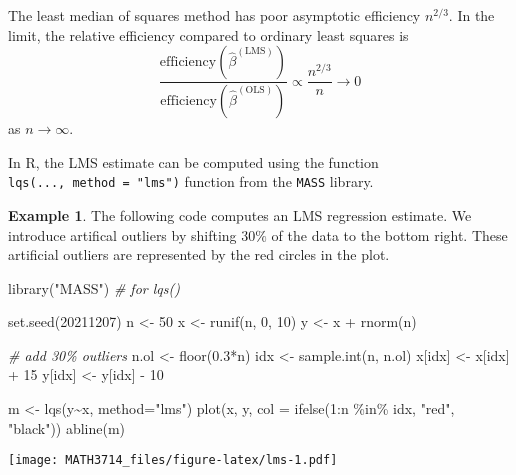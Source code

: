 \documentclass[
  a4paper,
]{article}
\newenvironment{Shaded}{\begin{snugshade}}{\end{snugshade}}
\newcommand{\AttributeTok}[1]{\textcolor[rgb]{0.77,0.63,0.00}{#1}}
\newcommand{\CommentTok}[1]{\textcolor[rgb]{0.56,0.35,0.01}{\textit{#1}}}
\newcommand{\DecValTok}[1]{\textcolor[rgb]{0.00,0.00,0.81}{#1}}
\newcommand{\FloatTok}[1]{\textcolor[rgb]{0.00,0.00,0.81}{#1}}
\newcommand{\FunctionTok}[1]{\textcolor[rgb]{0.00,0.00,0.00}{#1}}
\newcommand{\NormalTok}[1]{#1}
\newcommand{\OtherTok}[1]{\textcolor[rgb]{0.56,0.35,0.01}{#1}}
\newcommand{\SpecialCharTok}[1]{\textcolor[rgb]{0.00,0.00,0.00}{#1}}
\newcommand{\StringTok}[1]{\textcolor[rgb]{0.31,0.60,0.02}{#1}}
\theoremstyle{definition}
\theoremstyle{definition}
\newtheorem{example}{Example}[section]
\theoremstyle{definition}
\theoremstyle{definition}
\theoremstyle{remark}
\begin{document}
The least median of squares method has poor asymptotic efficiency \(n^{2/3}\).
In the limit, the relative efficiency compared to ordinary least squares is
\begin{equation*}
  \frac{\mathrm{efficiency}(\hat\beta^\mathrm{(LMS)})}{\mathrm{efficiency}(\hat\beta^\mathrm{(OLS)})}
  \propto \frac{n^{2/3}}{n}
  \longrightarrow 0
\end{equation*}
as \(n\to\infty\).

In R, the LMS estimate can be computed using the function
\texttt{lqs(...,\ method\ =\ "lms")} function from the \texttt{MASS} library.

\begin{example}
The following code computes an LMS regression estimate. We
introduce artifical outliers by shifting \(30\%\) of the data
to the bottom right. These artificial outliers are represented
by the red circles in the plot.

\begin{Shaded}
\begin{Highlighting}[]
\FunctionTok{library}\NormalTok{(}\StringTok{"MASS"}\NormalTok{) }\CommentTok{\# for lqs()}

\FunctionTok{set.seed}\NormalTok{(}\DecValTok{20211207}\NormalTok{)}
\NormalTok{n }\OtherTok{\textless{}{-}} \DecValTok{50}
\NormalTok{x }\OtherTok{\textless{}{-}} \FunctionTok{runif}\NormalTok{(n, }\DecValTok{0}\NormalTok{, }\DecValTok{10}\NormalTok{)}
\NormalTok{y }\OtherTok{\textless{}{-}}\NormalTok{ x }\SpecialCharTok{+} \FunctionTok{rnorm}\NormalTok{(n)}

\CommentTok{\# add 30\% outliers}
\NormalTok{n.ol }\OtherTok{\textless{}{-}} \FunctionTok{floor}\NormalTok{(}\FloatTok{0.3}\SpecialCharTok{*}\NormalTok{n)}
\NormalTok{idx }\OtherTok{\textless{}{-}} \FunctionTok{sample.int}\NormalTok{(n, n.ol)}
\NormalTok{x[idx] }\OtherTok{\textless{}{-}}\NormalTok{ x[idx] }\SpecialCharTok{+} \DecValTok{15}
\NormalTok{y[idx] }\OtherTok{\textless{}{-}}\NormalTok{ y[idx] }\SpecialCharTok{{-}} \DecValTok{10}

\NormalTok{m }\OtherTok{\textless{}{-}} \FunctionTok{lqs}\NormalTok{(y}\SpecialCharTok{\textasciitilde{}}\NormalTok{x, }\AttributeTok{method=}\StringTok{"lms"}\NormalTok{)}
\FunctionTok{plot}\NormalTok{(x, y, }\AttributeTok{col =} \FunctionTok{ifelse}\NormalTok{(}\DecValTok{1}\SpecialCharTok{:}\NormalTok{n }\SpecialCharTok{\%in\%}\NormalTok{ idx, }\StringTok{"red"}\NormalTok{, }\StringTok{"black"}\NormalTok{))}
\FunctionTok{abline}\NormalTok{(m)}
\end{Highlighting}
\end{Shaded}

\texttt{[image: MATH3714\_files/figure-latex/lms-1.pdf]}
\end{example}
\end{document}
